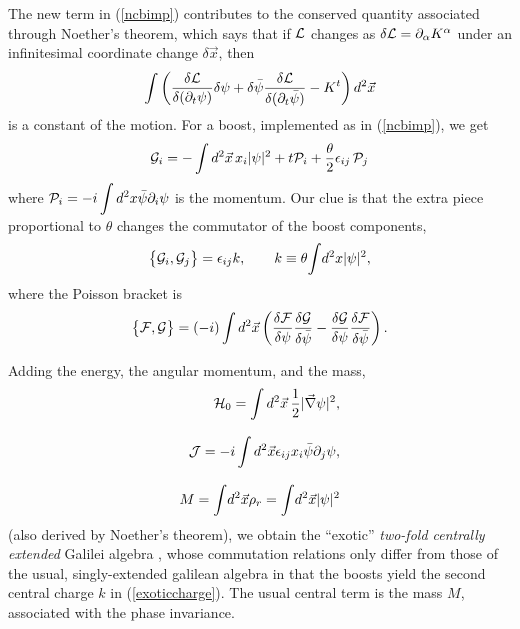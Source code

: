 \documentclass[a4paper,11pt]{article}
\def\p{{\partial}}
\def\vx{{\vec x}}
\def\vnabla{{\vec\nabla}}
\begin{document}
The new term in (\ref{ncbimp}) contributes
to the conserved quantity associated through
Noether's theorem, which says that
if ${\cal L}$ changes as
$\delta{\cal L}=\p_{\alpha}K^{\alpha}$ under an
infinitesimal coordinate change $\delta \vx$, then
\begin{equation}
   \int\left(\frac{\delta{\cal L}}{\delta(\p_{t}\psi)}\delta\psi
  +\delta\bar{\psi}\frac{\delta{\cal L}}{\delta(\p_{t}\bar{\psi})}
     -K^{t}\right)d^2\vx
\label{Noether}
\end{equation}
is a constant of the motion.
For a boost, implemented as in (\ref{ncbimp}), we get
\begin{equation}
     {\cal G}_{i}=-\int d^2\vx\,x_{i}\vert\psi\vert^2
     +t{\cal P}_{i}
     +\frac{\theta}{2}\epsilon_{ij}\,{\cal P}_{j}
     \label{exoboost}
\end{equation}
where
${\cal P}_{i}=-i\displaystyle\int d^2x\bar{\psi}\p_{i}\psi$
is the momentum.
Our clue is that the extra piece proportional to $\theta$ changes the
commutator of the boost components,
\begin{equation}
     \big\{{\cal G}_{i},{\cal G}_{j}\big\}=\epsilon_{ij}k,
     \qquad
     k\equiv
     \theta\!\int\! d^2x\vert\psi\vert^2,
     \label{exoticcharge}
\end{equation}
where the Poisson bracket is
\begin{equation}
     \big\{{\cal F}, {\cal G}\big\}=(-i)
     \displaystyle\int d^{2}\vx\left(\frac
     {\delta{\cal F}}{\delta\psi}\frac{\delta{\cal G}}{\delta\bar{\psi}}
     -
     \frac{\delta{\cal G}}{\delta\psi}\frac{\delta{\cal F}}
     {\delta\bar{\psi}}\right).
\label{PBdef}
\end{equation}

Adding the energy, the angular momentum, and the mass,
\begin{eqnarray}
     {\cal H}_{0}=\int d^2\vx\,
     \frac{1}{2}\vert\vnabla\psi\vert^2,
     \\[8pt]
     {\cal J}=-i\int d^2\vx\epsilon_{ij}x_{i}\bar{\psi}\p_{j}\psi,
     \\[8pt]
     M=\int\!d^2\vx\rho_{r}=\int\!d^2\vx|\psi|^2
\label{enerangmommass}
\end{eqnarray}
(also derived by Noether's theorem),
we obtain the  ``exotic''
{\it two-fold centrally extended}
Galilei algebra \cite{LeLe}, whose commutation relations only differ
from those of the usual, singly-extended galilean algebra in that
the boosts yield the second central charge
$k$ in (\ref{exoticcharge}). The usual central term is
the mass $M$, associated with the phase invariance.
\end{document}
